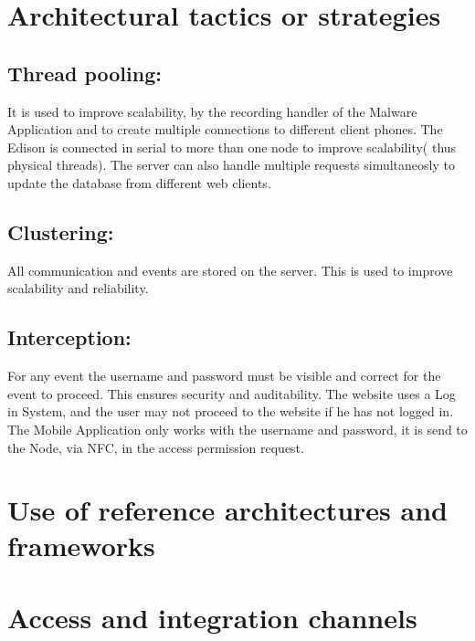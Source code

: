 \documentclass[a4paper,12pt,titlepage]{article}
\begin{document}
\newpage\section{Architectural tactics or strategies}
	\subsection{Thread pooling: }It is used to improve scalability, by the recording handler of the Malware Application and to create multiple connections to different client phones. The Edison is connected in serial to more than one node to improve scalability( thus physical threads). The server can also handle multiple requests simultaneosly to update the database from different web clients.
	\subsection{Clustering: } All communication and events are stored on the server. This is used to improve scalability and reliability. 
	\subsection{ Interception: }For any event the username and password must be visible and correct for the event to proceed. This ensures security and auditability. The website uses a Log in System, and the user may not proceed to the website if he has not logged in. The Mobile Application only works with the username and password, it is send to the Node, via NFC, in the access permission request. 


\newpage	\section{Use of reference architectures and frameworks}


\newpage	\section{Access and integration channels}
\end{document}
